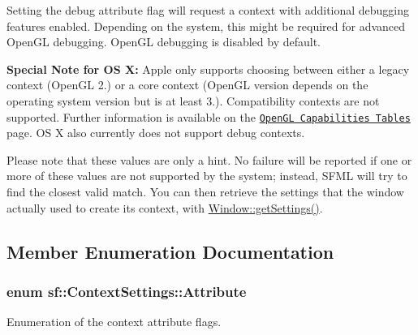 Setting the debug attribute flag will request a context with additional debugging features enabled. Depending on the system, this might be required for advanced Open\-G\-L debugging. Open\-G\-L debugging is disabled by default.

{\bfseries Special Note for O\-S X\-:} Apple only supports choosing between either a legacy context (Open\-G\-L 2.) or a core context (Open\-G\-L version depends on the operating system version but is at least 3.). Compatibility contexts are not supported. Further information is available on the \href{https://developer.apple.com/opengl/capabilities/index.html}{\tt Open\-G\-L Capabilities Tables} page. O\-S X also currently does not support debug contexts.

Please note that these values are only a hint. No failure will be reported if one or more of these values are not supported by the system; instead, S\-F\-M\-L will try to find the closest valid match. You can then retrieve the settings that the window actually used to create its context, with \hyperlink{classsf_1_1_window_a5a9d5c15facf25ad4d9b2b30caa0a2db}{Window\-::get\-Settings()}. 

\subsection{Member Enumeration Documentation}
\hypertarget{structsf_1_1_context_settings_af2e91e57e8d26c40afe2ec8efaa32a2c}{
\subsubsection[{Attribute}]{\setlength{\rightskip}{0pt plus 5cm}enum {\bf sf\-::\-Context\-Settings\-::\-Attribute}}}\label{structsf_1_1_context_settings_af2e91e57e8d26c40afe2ec8efaa32a2c}


Enumeration of the context attribute flags. 

